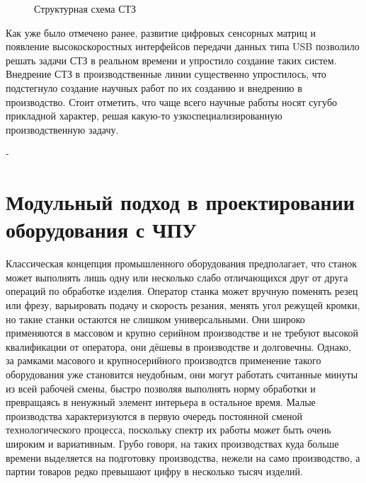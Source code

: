 \begin{figure}[h]
	\caption{Структурная схема СТЗ}\label{fig:stz-ussr}
\end{figure}

Как уже было отмечено ранее, развитие цифровых сенсорных матриц и появление высокоскоростных интерфейсов передачи данных типа USB позволило решать задачи СТЗ в реальном времени и упростило создание таких систем. Внедрение СТЗ в производственные линии существенно упростилось, что подстегнуло создание научных работ по их созданию и внедрению в производство. Стоит отметить, что чаще всего научные работы носят сугубо прикладной характер, решая какую-то узкоспециализированную производственную задачу.

-

\section{Модульный подход в проектировании оборудования с ЧПУ} \label{sect1_4}

Классическая концепция промышленного оборудования предполагает, что станок может выполнять лишь одну или несколько слабо отличающихся друг от друга операций по обработке изделия. Оператор станка может вручную поменять резец или фрезу, варьировать подачу и скорость резания, менять угол режущей кромки, но такие станки остаются не слишком универсальными. Они широко применяются в массовом и крупно серийном производстве и не требуют высокой квалификации от оператора, они дёшевы в производстве и долговечны. Однако, за рамками масового и крупносерийного производтсв применение такого оборудования уже становится неудобным, они могут работать считанные минуты из всей рабочей смены, быстро позволяя выполнять норму обработки и превращаясь в ненужный элемент интерьера в остальное время. Малые производства характеризуются в первую очередь постоянной сменой технологического процесса, поскольку спектр их работы может быть очень широким и вариативным. Грубо говоря, на таких производствах куда больше времени выделяется на подготовку производства, нежели на само производство, а партии товаров редко превышают цифру в несколько тысяч изделий.


